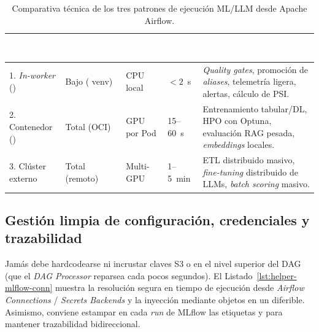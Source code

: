 \begin{table}[htbp]
\centering
\caption{Comparativa técnica de los tres patrones de ejecución ML/LLM desde Apache Airflow.}
\label{tab:patrones-ejecucion-ml}
\small
\begin{tabularx}{\textwidth}{@{}L{2.5cm} C{2.0cm} C{1.7cm} C{1.8cm} Y@{}}
\toprule
{}
\textcolor{white}{\sffamily\bfseries Patrón} &
\textcolor{white}{\sffamily\bfseries Aislamiento} &
\textcolor{white}{\sffamily\bfseries GPU / Escala} &
\textcolor{white}{\sffamily\bfseries \textit{Cold start}} &
\textcolor{white}{\sffamily\bfseries Casos de uso óptimos} \\
. \textit{In-worker} () &
Bajo (\partialmark{} venv) &
\nomark{} CPU local &
$<2$~s &
\textit{Quality gates}, promoción de \textit{aliases}, telemetría ligera, alertas, cálculo de PSI. \\
2. Contenedor () &
Total (OCI) &
\yesmark{} GPU por Pod &
15--60~s &
Entrenamiento tabular/DL, HPO con Optuna, evaluación RAG pesada, \textit{embeddings} locales. \\
3. Clúster externo &
Total (remoto) &
\yesmark{} Multi-GPU &
1--5~min &
ETL distribuido masivo, \textit{fine-tuning} distribuido de LLMs, \textit{batch scoring} masivo. \\
\bottomrule
\end{tabularx}
\end{table}

\subsection{Gestión limpia de configuración, credenciales y trazabilidad}

Jamás debe hardcodearse  ni incrustar claves S3 o  en el nivel superior del DAG (que el \textit{DAG Processor} reparsea cada pocos segundos). El Listado~\ref{lst:helper-mlflow-conn} muestra la resolución segura en tiempo de ejecución desde \textit{Airflow Connections} / \textit{Secrets Backends} y la inyección mediante objetos  en un  diferible. Asimismo, conviene estampar en cada \textit{run} de MLflow las etiquetas  y  para mantener trazabilidad bidireccional.

